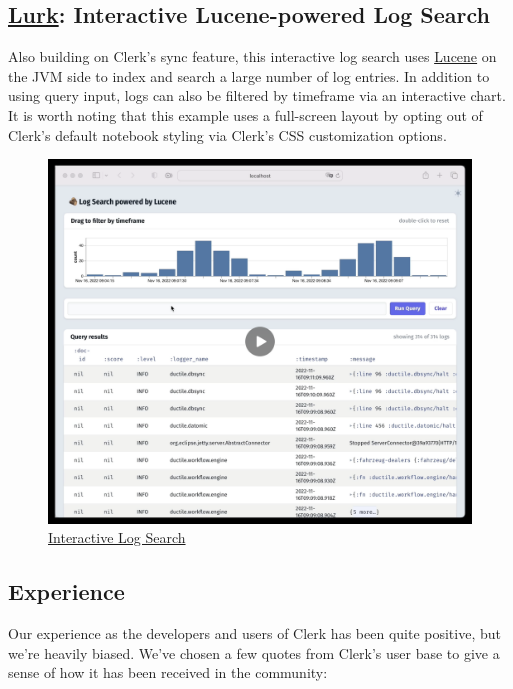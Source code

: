 \documentclass[sigconf,screen]{acmart}
\begin{document}
\hypertarget{id}{%
\subsection{\texorpdfstring{\href{https://github.com/nextjournal/lurk}{Lurk}: Interactive Lucene-powered Log Search}{Lurk: Interactive Lucene-powered Log Search}}\label{id}}

Also building on Clerk's sync feature, this interactive log search uses \href{https://lucene.apache.org/}{Lucene} on the JVM side to index and search a large number of log entries. In addition to using query input, logs can also be filtered by timeframe via an interactive chart. It is worth noting that this example uses a full-screen layout by opting out of Clerk's default notebook styling via Clerk's CSS customization options.

\begin{figure}[H]
\centering
\includegraphics{images/interactive-log-search.png}
\caption{\href{https://cdn.nextjournal.com/data/QmampWSVabdYtYpcN46rPjWGZK1KRebvsHHsx24zeudY8Q?content-type=image/png}{Interactive Log Search}}
\end{figure}

\hypertarget{id}{%
\subsection{Experience}\label{id}}

Our experience as the developers and users of Clerk has been quite positive, but we're heavily biased. We've chosen a few quotes from Clerk's user base to give a sense of how it has been received in the community:
\end{document}
